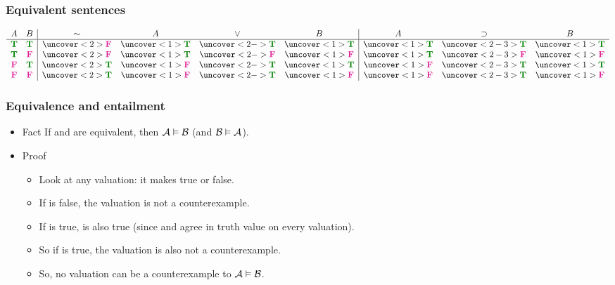 \begin{frame}
\frametitle{Equivalent sentences}


\[\begin{array}{cc|cccc|cccc}
A & B & \enot & A & \eor & B & A & \eif & B\\
\hline
\True & \True & \uncover<2>{\False} & \uncover<1>{\True} &
\uncover<2->{\True} & \uncover<1>{\True} & \uncover<1>{\True} &
\uncover<2-3>{\True} & \uncover<1>{\True} \\
\True & \False & \uncover<2>{\False} & \uncover<1>{\True} &
\uncover<2->{\False} & \uncover<1>{\False} & \uncover<1>{\True} &
\uncover<2-3>{\False} & \uncover<1>{\False} \\
\False & \True & \uncover<2>{\True} & \uncover<1>{\False} &
\uncover<2->{\True} & \uncover<1>{\True} & \uncover<1>{\False} &
\uncover<2-3>{\True} & \uncover<1>{\True} \\
\False & \False & \uncover<2>{\True} & \uncover<1>{\False} &
\uncover<2->{\True} & \uncover<1>{\False} & \uncover<1>{\False} &
\uncover<2-3>{\True} & \uncover<1>{\False}
\end{array}
\]
\end{frame}

\begin{frame}
\frametitle{Equivalence and entailment}

\begin{itemize}[<+->]
\item[]\begin{block}{Fact}
If  and  are equivalent, then $\mathcal{A} \vDash
\mathcal{B}$ (and $\mathcal{B} \vDash \mathcal{A}$).
\end{block}

\item[]\begin{block}{Proof}
\begin{itemize}[<+->]
  \item Look at any valuation: it makes  true or false.
  \item If  is false, the valuation is not a counterexample.
  \item If  is true,  is also true (since 
  and  agree in truth value on every valuation).
  \item So if  is true, the valuation is also not a counterexample.
  \item So, no valuation can be a counterexample to $\mathcal{A} \vDash \mathcal{B}$.
\end{itemize}
\end{block}
\end{itemize}
\end{frame}


